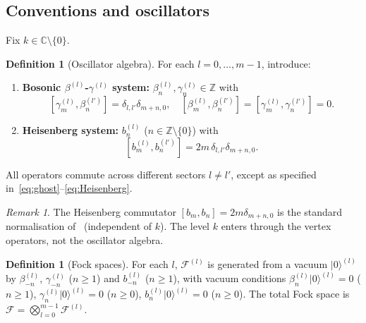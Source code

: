 \documentclass[12pt]{article}
\theoremstyle{plain}
\theoremstyle{definition}
\newtheorem{definition}[theorem]{Definition}
\theoremstyle{remark}
\newtheorem{remark}[theorem]{Remark}
\newcommand{\C}{\mathbb{C}}
\newcommand{\Z}{\mathbb{Z}}
\newcommand{\bl}[1]{\beta^{(#1)}}
\newcommand{\gl}[1]{\gamma^{(#1)}}
\newcommand{\Fl}[1]{\mathcal{F}^{(#1)}}
\begin{document}
\subsection{Conventions and oscillators}
Fix $k\in\C\setminus\{0\}$.
\begin{definition}[Oscillator algebra]\label{def:oscillators}
  For each $l=0,\ldots,m-1$, introduce:
  \begin{enumerate}[label=\textup{(\roman*)}]
    \item \textbf{Bosonic $\beta^{(l)}$-$\gamma^{(l)}$ system:}
      $\bl{l}_n,\gl{l}_n\in\Z$ with
      \begin{equation}\label{eq:ghost}
        [\gl{l}_m,\bl{l'}_n]=\delta_{l,l'}\delta_{m+n,0},\quad
        [\bl{l}_m,\bl{l'}_n]=[\gl{l}_m,\gl{l'}_n]=0.
      \end{equation}
    \item \textbf{Heisenberg system:}
      $b^{(l)}_n$ ($n\in\Z\setminus\{0\}$) with
      \begin{equation}\label{eq:Heisenberg}
        [b^{(l)}_m,b^{(l')}_n]=2m\,\delta_{l,l'}\delta_{m+n,0}.
      \end{equation}
  \end{enumerate}
  All operators commute across different sectors $l\neq l'$, except
  as specified in~\eqref{eq:ghost}--\eqref{eq:Heisenberg}.
\end{definition}
\begin{remark}
  The Heisenberg commutator $[b_m,b_n]=2m\delta_{m+n,0}$ is the standard
  normalisation of~\cite{Frenkel2005} (independent of $k$).
  The level $k$ enters through the vertex operators, not the oscillator algebra.
\end{remark}
\begin{definition}[Fock spaces]\label{def:Fock}
  For each $l$, $\Fl{l}$ is generated from a vacuum $|0\rangle^{(l)}$ by
  $\bl{l}_{-n}$, $\gl{l}_{-n}$ ($n\geq 1$) and $b^{(l)}_{-n}$ ($n\geq 1$),
  with vacuum conditions
  $\bl{l}_n|0\rangle^{(l)}=0$ ($n\geq 1$),
  $\gl{l}_n|0\rangle^{(l)}=0$ ($n\geq 0$),
  $b^{(l)}_n|0\rangle^{(l)}=0$ ($n\geq 0$).
  The total Fock space is $\mathcal{F}=\bigotimes_{l=0}^{m-1}\Fl{l}$.
\end{definition}
\end{document}
